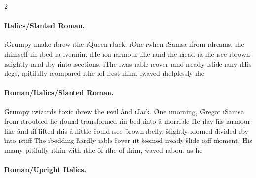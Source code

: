 \documentclass[a4paper]{article}
\begin{document}
\begin{multicols}{2}
  \paragraph{Italics/Slanted Roman.}\leavevmode

  \i{Grumpy}  \i{make}  \i{brew}  \i{the}  \i{Queen}  \i{Jack.}
  \i{One}  \i{when}  \i{Samsa}  \i{from}  \i{dreams,}
  \i{he}  \i{himself}  \i{in}  \i{bed}  \i{a}  \i{vermin.}
  \i{He}  \i{on}  \i{armour-like} 
  \i{and}  \i{he}   \i{head}
  \i{a}  \i{he}  \i{see}  \i{brown} 
  \i{slightly}  \i{and}  \i{by}  \i{into}  \i{sections.}
  \i{The}  \i{was}  \i{able} 
  \i{cover}  \i{and}  \i{ready}  \i{slide}  \i{any} 
  \i{His}  \i{legs,}
  \i{pitifully}  \i{compared}  \i{the}  \i{of}  \i{rest}  \i{him,}
  \i{waved}  \i{helplessly}  \i{he} 

  \paragraph{Roman/Italics/Slanted Roman.}\leavevmode

  \r{Grumpy} \i{wizards}  \r{toxic} \i{brew}  \r{the} \i{evil}  \r{and} \i{Jack.}
  \r{One} \i{morning,}  \r{Gregor} \i{Samsa}  \r{from} \i{troubled} 
  \r{he} \i{found}  \r{transformed} \i{in}  \r{bed} \i{into} \r{a} \i{horrible} 
  \r{He} \i{lay}  \r{his} \i{armour-like} 
  \r{and} \i{if}  \r{lifted} \i{his} 
  \r{a} \i{little}  \r{could} \i{see}  \r{brown} \i{belly,}
  \r{slightly} \i{domed}  \r{divided} \i{by}  \r{into} \i{stiff} 
  \r{The} \i{bedding}  \r{hardly} \i{able} 
  \r{cover} \i{it}  \r{seemed} \i{ready}  \r{slide} \i{off}  \r{moment.}
  \r{His} \i{many} 
  \r{pitifully} \i{thin}  \r{with} \i{the}  \r{of} \i{the}  \r{of} \i{him,}
  \r{waved} \i{about}  \r{as} \r{he} 

  \paragraph{Roman/Upright Italics.}\leavevmode


\end{multicols}
\end{document}
